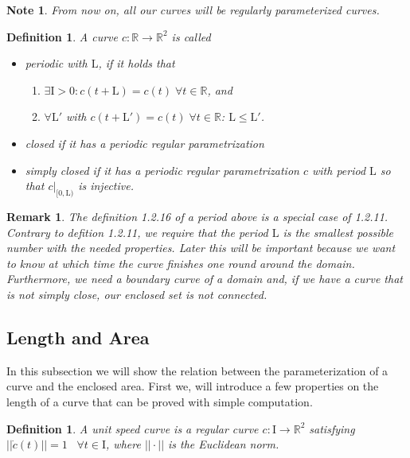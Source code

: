 \documentclass[a4paper]{book}
\newtheorem{remark}[theorem]{Remark}%
\newtheorem{note}[theorem]{Note}%
\newtheorem{definition}[theorem]{Definition}%
\numberwithin{theorem}{section}%
\begin{document}
\begin{note}
    From now on, all our curves will be regularly parameterized curves.
\end{note}

\begin{definition}
    A curve $c:\mathbb{R}\to\mathbb{R}^{2}$ is called
    \begin{itemize}
        \item periodic with $\mathrm{L}$, if it holds that
        \begin{enumerate}
            \item $\exists\mathrm{I}>0: c(t+\mathrm{L})=c(t)\;\forall t\in\mathbb{R}$, and
            \item $\forall\mathrm{L}'$ with $c(t+\mathrm{L}')=c(t)\;\forall t\in\mathbb{R}$: $\mathrm{L}\leq\mathrm{L}'$.
        \end{enumerate}
        \item closed if it has a periodic regular parametrization
        \item simply closed if it has a periodic regular parametrization $c$ with period $\mathrm{L}$ so that $c|_{[0,\mathrm{L})}$ is injective.
    \end{itemize}
\end{definition}

\begin{remark}
    The definition 1.2.16 of a period above is a special case of 1.2.11. Contrary to defition 1.2.11, we require that the period $\mathrm{L}$ is the smallest possible number with the needed properties. Later this will be important because we want to know at which time the curve finishes one round around the domain. Furthermore, we need a boundary curve of a domain and, if we have a curve that is not simply close, our enclosed set is not connected.
\end{remark}

\subsection{Length and Area}
In this subsection we will show the relation between the parameterization of a curve and the enclosed area. First we, will introduce a few properties on the length of a curve that can be proved with simple computation.

\begin{definition}
    A unit speed curve is a regular curve $c:\mathrm{I}\to\mathbb{R}^2$ satisfying $||\dot{c}(t)||=1\;\;\;\forall t\in\mathrm{I}$, where $||\cdot||$ is the Euclidean norm.
\end{definition}
\end{document}
